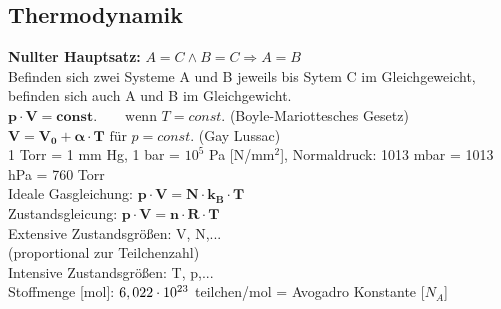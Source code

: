 \subsection{Thermodynamik}

\textbf{Nullter Hauptsatz:} $A=C \wedge B=C \Rightarrow A=B$\\
Befinden sich zwei Systeme A und B jeweils bis Sytem C im Gleichgeweicht, befinden sich auch A und B im Gleichgewicht.\\

$\bm{p \cdot V = const.} \qquad \text{wenn } T=const$. \qquad (Boyle-Mariottesches Gesetz)\\

$\bm{V=V_0+\alpha \cdot T} \text{ für } p=const.$ \qquad (Gay Lussac)\\

1 Torr = 1 mm Hg, 1 bar = $10^5$ Pa [N/mm$^2$], Normaldruck: 1013 mbar = 1013 hPa = 760 Torr\\

Ideale Gasgleichung: $\bm{p\cdot V = N\cdot k_B \cdot T}$\\

Zustandsgleicung: $\bm{p\cdot V = n\cdot R \cdot T}$\\

Extensive Zustandsgrößen: V, N,...\\
(proportional zur Teilchenzahl)\\

Intensive Zustandsgrößen: T, p,...\\

Stoffmenge [mol]: $6,022 \cdot 10^{23}$ teilchen/mol = Avogadro Konstante [$N_A$]\\



